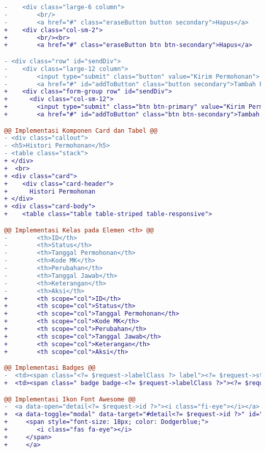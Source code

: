 \begin{lstlisting}[language=diff, caption=Perubahan file \path{\views\PerubahanKuliahRequest\main.php} , label=Entri, basicstyle=\ttfamily, frame=single,
columns=fullflexible, keepspaces=true, breaklines=true]
-    <div class="large-6 column">
-        <br/>
-        <a href="#" class="eraseButton button secondary">Hapus</a>
+    <div class="col-sm-2">
+        <br/><br>
+        <a href="#" class="eraseButton btn btn-secondary">Hapus</a>

- <div class="row" id="sendDiv">
-    <div class="large-12 column">
-        <input type="submit" class="button" value="Kirim Permohonan">
-        <a href="#" id="addToButton" class="button secondary">Tambah Pertemuan Ekstra</a>
+    <div class="form-group row" id="sendDiv">
+      <div class="col-sm-12">
+        <input type="submit" class="btn btn-primary" value="Kirim Permohonan">
+        <a href="#" id="addToButton" class="btn btn-secondary">Tambah Pertemuan Ekstra</a>

@@ Implementasi Komponen Card dan Tabel @@
- <div class="callout">
- <h5>Histori Permohonan</h5>
- <table class="stack">
+ </div>
+  <br>
+ <div class="card">
+    <div class="card-header">
+      Histori Permohonan
+ </div>
+ <div class="card-body">
+    <table class="table table-striped table-responsive">

@@ Implementasi Kelas pada Elemen <th> @@
-        <th>ID</th>
-        <th>Status</th>
-        <th>Tanggal Permohonan</th>
-        <th>Kode MK</th>
-        <th>Perubahan</th>
-        <th>Tanggal Jawab</th>
-        <th>Keterangan</th>
-        <th>Aksi</th>
+        <th scope="col">ID</th>
+        <th scope="col">Status</th>
+        <th scope="col">Tanggal Permohonan</th>
+        <th scope="col">Kode MK</th>
+        <th scope="col">Perubahan</th>
+        <th scope="col">Tanggal Jawab</th>
+        <th scope="col">Keterangan</th>
+        <th scope="col">Aksi</th>

@@ Implementasi Badges @@
-  <td><span class="<?= $request->labelClass ?> label"><?= $request->status ?></span></td>
+  <td><span class=" badge badge-<?= $request->labelClass ?>"><?= $request->status ?></span></td>

@@ Implementasi Ikon Font Awesome @@
-  <a data-open="detail<?= $request->id ?>"><i class="fi-eye"></i></a>
+  <a data-toggle="modal" data-target="#detail<?= $request->id ?>" id="detailIkon<?= $request->id ?>">
+     <span style="font-size: 18px; color: Dodgerblue;">
+        <i class="fas fa-eye"></i>
+     </span>
+     </a>


\end{lstlisting}
